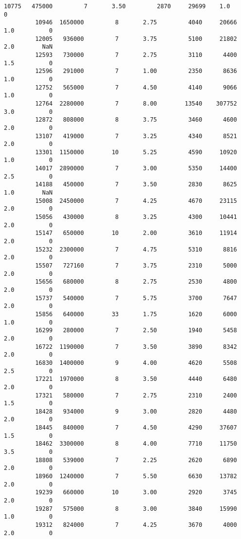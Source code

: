 \documentclass[11pt]{article}
\begin{document}
\begin{Verbatim}[commandchars=\\\{\}]
         10775   475000         7       3.50         2870     29699    1.0          0   
         10946  1650000         8       2.75         4040     20666    1.0          0   
         12005   936000         7       3.75         5100     21802    2.0        NaN   
         12593   730000         7       2.75         3110      4400    1.5          0   
         12596   291000         7       1.00         2350      8636    1.0          0   
         12752   565000         7       4.50         4140      9066    1.0          0   
         12764  2280000         7       8.00        13540    307752    3.0          0   
         12872   808000         8       3.75         3460      4600    2.0          0   
         13107   419000         7       3.25         4340      8521    2.0          0   
         13301  1150000        10       5.25         4590     10920    1.0          0   
         14017  2890000         7       3.00         5350     14400    2.5          0   
         14188   450000         7       3.50         2830      8625    1.0        NaN   
         15008  2450000         7       4.25         4670     23115    2.0          0   
         15056   430000         8       3.25         4300     10441    2.0          0   
         15147   650000        10       2.00         3610     11914    2.0          0   
         15232  2300000         7       4.75         5310      8816    2.0          0   
         15507   727160         7       3.75         2310      5000    2.0          0   
         15656   680000         8       2.75         2530      4800    2.0          0   
         15737   540000         7       5.75         3700      7647    2.0          0   
         15856   640000        33       1.75         1620      6000    1.0          0   
         16299   280000         7       2.50         1940      5458    2.0          0   
         16722  1190000         7       3.50         3890      8342    2.0          0   
         16830  1400000         9       4.00         4620      5508    2.5          0   
         17221  1970000         8       3.50         4440      6480    2.0          0   
         17321   580000         7       2.75         2310      2400    1.5          0   
         18428   934000         9       3.00         2820      4480    2.0          0   
         18445   840000         7       4.50         4290     37607    1.5          0   
         18462  3300000         8       4.00         7710     11750    3.5          0   
         18808   539000         7       2.25         2620      6890    2.0          0   
         18960  1240000         7       5.50         6630     13782    2.0          0   
         19239   660000        10       3.00         2920      3745    2.0          0   
         19287   575000         8       3.00         3840     15990    1.0          0   
         19312   824000         7       4.25         3670      4000    2.0          0   
         

\end{Verbatim}
\end{document}
